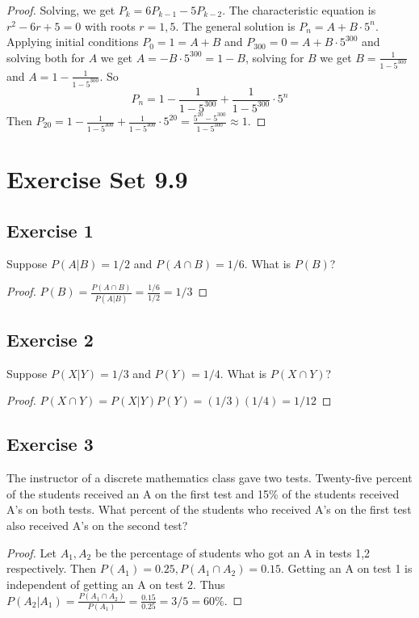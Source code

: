 \documentclass[14pt]{extarticle}
\newcommand{\dps}{\displaystyle}
\begin{document}
\begin{proof}
Solving, we get \(P_k = 6P_{k-1} - 5P_{k-2}\). The characteristic equation is \(r^2 - 6r + 5 = 0\) with roots
\(r = 1,5\). The general solution is \(P_n = A+B \cdot 5^n\). Applying initial conditions \(P_0 = 1 = A + B\) and \(P_{300}
= 0 = A + B \cdot 5^{300}\) and solving both for \(A\) we get \(A = -B \cdot 5^{300} = 1-B\), solving for \(B\) we get 
\(\dps B = \frac{1}{1-5^{300}}\) and \(\dps A = 1 - \frac{1}{1-5^{300}}\). So
\[
P_n = 1 - \frac{1}{1-5^{300}} + \frac{1}{1-5^{300}} \cdot 5^n
\]
Then \(\dps P_{20}=1-\frac{1}{1-5^{300}} + \frac{1}{1-5^{300}} \cdot 5^{20} = \frac{5^{20}-5^{300}}{1-5^{300}} \approx 1\).
\end{proof}

\section{Exercise Set 9.9}
\subsection{Exercise 1}
Suppose \(P(A|B) = 1/2\) and \(P(A \cap B) = 1/6\). What is \(P(B)\)?

\begin{proof}
\(P(B) = \frac{P(A \cap B)}{P(A | B)} = \frac{1/6}{1/2} = 1/3\)
\end{proof}

\subsection{Exercise 2}
Suppose \(P(X|Y) = 1/3\) and \(P(Y) = 1/4\). What is \(P(X \cap Y)\)?

\begin{proof}
\(P(X \cap Y) = P(X|Y)P(Y) = (1/3)(1/4) = 1/12\)
\end{proof}

\subsection{Exercise 3}
The instructor of a discrete mathematics class gave two tests. Twenty-five percent of the students received an A on the first 
test and 15\% of the students received A’s on both tests. What percent of the students who received A’s on the first test 
also received A’s on the second test?

\begin{proof}
Let \(A_1, A_2\) be the percentage of students who got an A in tests 1,2 respectively. Then \(P(A_1) = 0.25, P(A_1 \cap A_2)
= 0.15\). Getting an A on test 1 is independent of getting an A on test 2. Thus \(P(A_2 | A_1) = \frac{P(A_1 \cap A_2)}
{P(A_1)} = \frac{0.15}{0.25} = 3/5 = 60\%.\)
\end{proof}
\end{document}
